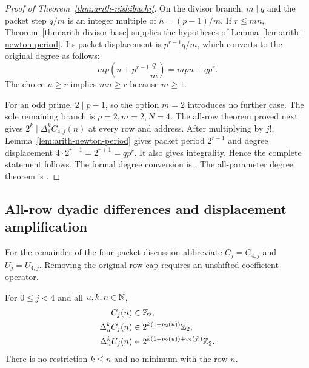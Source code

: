 \begin{proof}[Proof of Theorem~\ref{thm:arith-nishibuchi}]
On the divisor branch, $m\mid q$ and the packet step $q/m$ is an integer
multiple of $h=(p-1)/m$.  If $r\le mn$, Theorem~\ref{thm:arith-divisor-base}
supplies the hypotheses of Lemma~\ref{lem:arith-newton-period}.
Its packet displacement is $p^{r-1}q/m$, which converts to the original
degree as follows:
\[
 mp\left(n+p^{r-1}\frac qm\right)=mpn+qp^r.
\]
The choice $n\ge r$ implies $mn\ge r$ because $m\ge1$.

For an odd prime, $2\mid p-1$, so the option $m=2$ introduces no further
case.  The sole remaining branch is $p=2,m=2,N=4$.  The all-row theorem
proved next gives $2^k\mid\Delta_1^kC_{4,j}(n)$ at every row and address.
After multiplying by $j!$, Lemma~\ref{lem:arith-newton-period} gives packet
period $2^{r-1}$ and degree displacement $4\cdot2^{r-1}=2^{r+1}=qp^r$.
It also gives integrality.  Hence the complete statement follows.
The formal degree conversion is
.
The all-parameter degree theorem is
.
\end{proof}

\subsection{All-row dyadic differences and displacement amplification}

For the remainder of the four-packet discussion abbreviate
$C_j=C_{4,j}$ and $U_j=U_{4,j}$.  Removing the original row cap requires
an unshifted coefficient operator.

\begin{theorem}\label{thm:arith-dyadic-differences}
For $0\le j<4$ and all $u,k,n\in\mathbb N$,
\begin{align}
 C_j(n)&\in\mathbb Z_2,\\
 \Delta_u^kC_j(n)&\in 2^{k(1+\nu_2(u))}\mathbb Z_2,\label{eq:arith-allrow-c}\\
 \Delta_u^kU_j(n)&\in
 2^{k(1+\nu_2(u))+v_2(j!)}\mathbb Z_2.\label{eq:arith-allrow-u}
\end{align}
There is no restriction $k\le n$ and no minimum with the row $n$.
\end{theorem}

